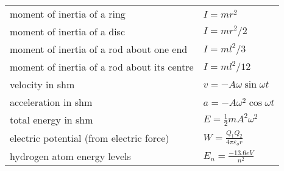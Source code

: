 \documentclass[main.tex]{subfiles}
\begin{document}
\renewcommand*{\arraystretch}{2}
\begin{longtable}{ll}

moment of inertia of a ring & $I = mr^2$\\

moment of inertia of a disc & $I = mr^{2}/2$\\

moment of inertia of a rod about one end & $I = ml^2/3$\\

moment of inertia of a rod about its centre & $I = ml^{2}/12$\\

velocity in shm & $v = -A\omega \sin{\omega t}$\\

acceleration in shm & $a = -A\omega^{2}\cos{\omega t}$\\

total energy in shm & $E = \frac{1}{2}mA^2\omega^2$\\

electric potential (from electric force) &
\(W = \frac{Q_{1}Q_{2}}{4\pi\varepsilon_{o}r}\)\\

hydrogen atom energy levels &\(E_{n} = \frac{- 13.6eV}{n^{2}}\)\\
\end{longtable}
\end{document}
